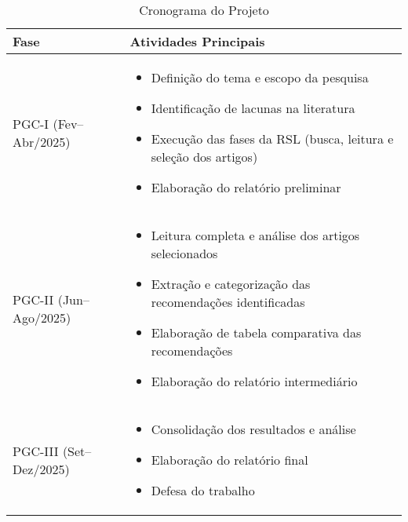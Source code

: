 \begin{table}[H]
\centering
\caption{Cronograma do Projeto}
\label{tab:cronograma}
\begin{tabular}{l|p{10cm}}
\hline
\textbf{Fase} & \textbf{Atividades Principais} \\ \hline
PGC-I (Fev–Abr/2025) & 
\begin{itemize}[leftmargin=*]
    \item Definição do tema e escopo da pesquisa
    \item Identificação de lacunas na literatura
    \item Execução das fases da RSL (busca, leitura e seleção dos artigos)
    \item Elaboração do relatório preliminar
\end{itemize} \\
PGC-II (Jun–Ago/2025) & 
\begin{itemize}[leftmargin=*]
    \item Leitura completa e análise dos artigos selecionados
    \item Extração e categorização das recomendações identificadas
    \item Elaboração de tabela comparativa das recomendações
    \item Elaboração do relatório intermediário
\end{itemize} \\
PGC-III (Set–Dez/2025) & 
\begin{itemize}[leftmargin=*]
    \item Consolidação dos resultados e análise
    \item Elaboração do relatório final
    \item Defesa do trabalho
\end{itemize} \\ \hline
\end{tabular}
\end{table}
